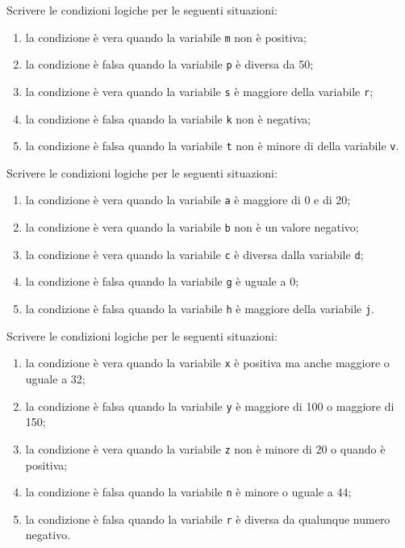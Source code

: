 \begin{exercise}
	Scrivere le condizioni logiche per le seguenti situazioni:
	\begin{enumerate}
		\item la condizione è vera quando la variabile \texttt{m} non è positiva;
		\item la condizione è falsa quando la variabile \texttt{p} è diversa da 50;
		\item la condizione è vera quando la variabile \texttt{s} è maggiore della variabile \texttt{r};
		\item la condizione è falsa quando la variabile \texttt{k} non è negativa;
		\item la condizione è falsa quando la variabile \texttt{t} non è minore di della variabile \texttt{v}.
	\end{enumerate}
\end{exercise}

\begin{exercise}
	Scrivere le condizioni logiche per le seguenti situazioni:
	\begin{enumerate}
		\item la condizione è vera quando la variabile \texttt{a} è maggiore di 0 e di 20;
		\item la condizione è vera quando la variabile \texttt{b} non è un valore negativo;
		\item la condizione è vera quando la variabile \texttt{c} è diversa dalla variabile \texttt{d};
		\item la condizione è falsa quando la variabile \texttt{g} è uguale a 0;
		\item la condizione è falsa quando la variabile \texttt{h} è maggiore della variabile \texttt{j}.
	\end{enumerate}
\end{exercise}

\begin{exercise}
	Scrivere le condizioni logiche per le seguenti situazioni:
	\begin{enumerate}
		\item la condizione è vera quando la variabile \texttt{x} è positiva ma anche maggiore o uguale a 32;
		\item la condizione è falsa quando la variabile \texttt{y} è maggiore di 100 o maggiore di 150;
		\item la condizione è vera quando la variabile \texttt{z} non è minore di 20 o quando è positiva;
		\item la condizione è falsa quando la variabile \texttt{n} è minore o uguale a 44;
		\item la condizione è falsa quando la variabile \texttt{r} è diversa da qualunque numero negativo.
	\end{enumerate}
\end{exercise}

